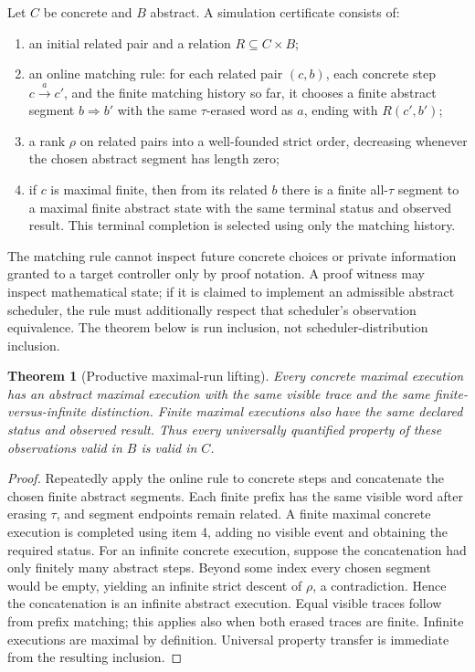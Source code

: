 \documentclass[11pt]{article}
\newtheorem{theorem}{Theorem}[section]
\begin{document}
Let $C$ be concrete and $B$ abstract. A simulation certificate consists of:
\begin{enumerate}
\item an initial related pair and a relation $R\subseteq C\times B$;
\item an online matching rule: for each related pair $(c,b)$, each concrete step $c\xrightarrow{a}c'$, and the finite matching history so far, it chooses a finite abstract segment $b\Rightarrow b'$ with the same $\tau$-erased word as $a$, ending with $R(c',b')$;
\item a rank $\rho$ on related pairs into a well-founded strict order, decreasing whenever the chosen abstract segment has length zero;
\item if $c$ is maximal finite, then from its related $b$ there is a finite all-$\tau$ segment to a maximal finite abstract state with the same terminal status and observed result. This terminal completion is selected using only the matching history.
\end{enumerate}
The matching rule cannot inspect future concrete choices or private information granted to a target controller only by proof notation. A proof witness may inspect mathematical state; if it is claimed to implement an admissible abstract scheduler, the rule must additionally respect that scheduler's observation equivalence. The theorem below is run inclusion, not scheduler-distribution inclusion.

\begin{theorem}[Productive maximal-run lifting]\label{resumption:lifting}
Every concrete maximal execution has an abstract maximal execution with the same visible trace and the same finite-versus-infinite distinction. Finite maximal executions also have the same declared status and observed result. Thus every universally quantified property of these observations valid in $B$ is valid in $C$.
\end{theorem}
\begin{proof}
Repeatedly apply the online rule to concrete steps and concatenate the chosen finite abstract segments. Each finite prefix has the same visible word after erasing $\tau$, and segment endpoints remain related. A finite maximal concrete execution is completed using item 4, adding no visible event and obtaining the required status. For an infinite concrete execution, suppose the concatenation had only finitely many abstract steps. Beyond some index every chosen segment would be empty, yielding an infinite strict descent of $\rho$, a contradiction. Hence the concatenation is an infinite abstract execution. Equal visible traces follow from prefix matching; this applies also when both erased traces are finite. Infinite executions are maximal by definition. Universal property transfer is immediate from the resulting inclusion.
\end{proof}
\end{document}
